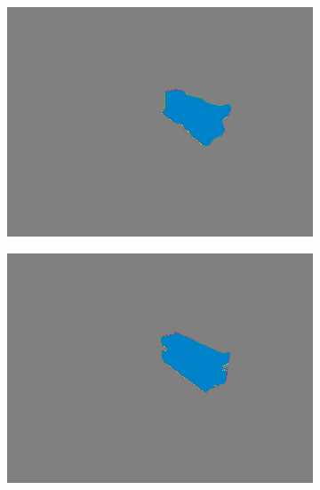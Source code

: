 \begin{figure}[h]
\begin{subfigure}{.24\textwidth}
			\includegraphics[width=1\linewidth]{images/sample_predictions/s40_40_G_013_mob_full_pred}
		\end{subfigure}
		\begin{subfigure}{.24\textwidth}
			\centering
			\includegraphics[width=1\linewidth]{images/sample_predictions/s40_40_G_013_xcep_full_pred}
		\end{subfigure}
		\begin{subfigure}{.24\textwidth}
			\centering

\end{subfigure}
\end{figure}
